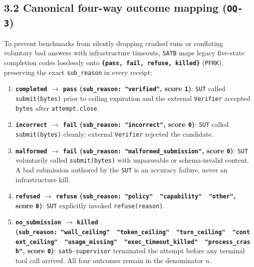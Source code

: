 \documentclass[10pt,letterpaper]{article}
\providecommand{\tightlist}{\setlength{\itemsep}{1pt}\setlength{\parskip}{0pt}}
\begin{document}
\subsection{\texorpdfstring{3.2 Canonical four-way outcome mapping
(\texttt{OQ-3})}{3.2 Canonical four-way outcome mapping (OQ-3)}}\label{canonical-four-way-outcome-mapping-oq-3}

To prevent benchmarks from silently dropping crashed runs or conflating
voluntary bad answers with infrastructure timeouts, \texttt{SATB} maps
legacy five-state completion codes losslessly onto
\textbf{\texttt{\{pass,\ fail,\ refuse,\ killed\}}} (\texttt{PFRK}),
preserving the exact \texttt{sub\_\allowbreak{}reason} in every receipt:

\begin{enumerate}
\def\labelenumi{\arabic{enumi}.}
\tightlist
\item
  \textbf{\texttt{completed} \(\to\) \texttt{pass}
  (\texttt{sub\_\allowbreak{}reason:\ "verified"}, score \texttt{1})}: \texttt{SUT}
  called \texttt{submit(\allowbreak{}bytes)} prior to ceiling expiration and the
  external \texttt{Verifier} accepted \texttt{bytes} after
  \texttt{attempt.\allowbreak{}close}.
\item
  \textbf{\texttt{incorrect} \(\to\) \texttt{fail}
  (\texttt{sub\_\allowbreak{}reason:\ "incorrect"}, score \texttt{0})}: \texttt{SUT}
  called \texttt{submit(\allowbreak{}bytes)} cleanly; external \texttt{Verifier}
  rejected the candidate.
\item
  \textbf{\texttt{malformed} \(\to\) \texttt{fail}
  (\texttt{sub\_\allowbreak{}reason:\ "malformed\_\allowbreak{}submission"}, score \texttt{0})}:
  \texttt{SUT} voluntarily called \texttt{submit(\allowbreak{}bytes)} with
  unparseable or schema-invalid content. A bad submission authored by
  the \texttt{SUT} is an accuracy failure, never an infrastructure kill.
\item
  \textbf{\texttt{refused} \(\to\) \texttt{refuse}
  (\texttt{sub\_reason:\ "policy"\ \textbar{}\ "capability"\ \textbar{}\ "other"},
  score \texttt{0})}: \texttt{SUT} explicitly invoked
  \texttt{refuse(\allowbreak{}reason)}.
\item
  \textbf{\texttt{no\_\allowbreak{}submission} \(\to\) \texttt{killed}
  (\texttt{sub\_reason:\ "wall\_ceiling"\ \textbar{}\ "token\_ceiling"\ \textbar{}\ "turn\_ceiling"\ \textbar{}\ "context\_ceiling"\ \textbar{}\ "usage\_missing"\ \textbar{}\ "exec\_timeout\_killed"\ \textbar{}\ "process\_crash"},
  score \texttt{0})}: \texttt{satb-\allowbreak{}supervisor} terminated the attempt
  before any terminal tool call arrived. All four outcomes remain in the
  denominator \(n\).
\end{enumerate}
\end{document}
